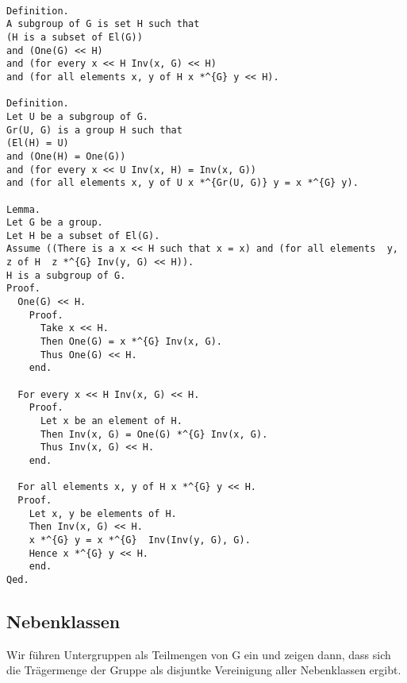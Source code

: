 \documentclass[a4paper,12pt]{scrartcl}
\begin{document}
\begin{lstlisting}

Definition.
A subgroup of G is set H such that
(H is a subset of El(G))
and (One(G) << H)
and (for every x << H Inv(x, G) << H)
and (for all elements x, y of H x *^{G} y << H).

Definition.
Let U be a subgroup of G.
Gr(U, G) is a group H such that
(El(H) = U)
and (One(H) = One(G))
and (for every x << U Inv(x, H) = Inv(x, G))
and (for all elements x, y of U x *^{Gr(U, G)} y = x *^{G} y).

Lemma.
Let G be a group.
Let H be a subset of El(G).
Assume ((There is a x << H such that x = x) and (for all elements  y, z of H  z *^{G} Inv(y, G) << H)).
H is a subgroup of G.
Proof.
  One(G) << H.
    Proof.
      Take x << H.
      Then One(G) = x *^{G} Inv(x, G).
      Thus One(G) << H.
    end.

  For every x << H Inv(x, G) << H.
    Proof.
      Let x be an element of H.
      Then Inv(x, G) = One(G) *^{G} Inv(x, G).
      Thus Inv(x, G) << H.
    end.

  For all elements x, y of H x *^{G} y << H.
  Proof.
    Let x, y be elements of H.
    Then Inv(x, G) << H.
    x *^{G} y = x *^{G}  Inv(Inv(y, G), G).
    Hence x *^{G} y << H.
    end.
Qed.

\end{lstlisting}

\subsection{Nebenklassen}

Wir führen Untergruppen als Teilmengen von G ein und zeigen dann, dass sich die Trägermenge der Gruppe als disjuntke Vereinigung aller Nebenklassen ergibt.
\end{document}
